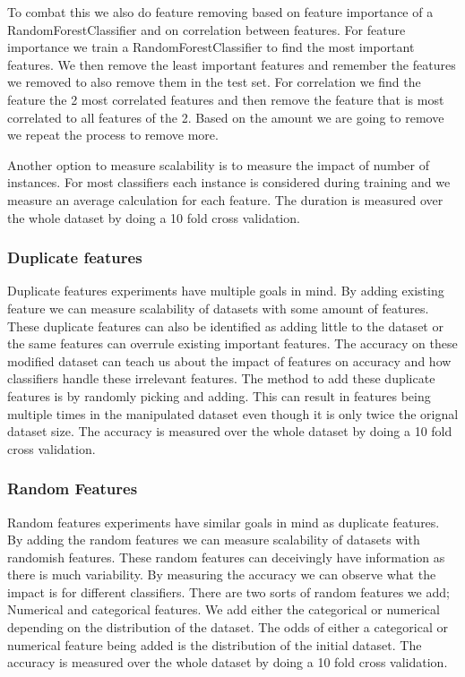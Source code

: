 \documentclass[a4paper,10pt]{article}
\begin{document}
To combat this we also do feature removing based on feature importance of a RandomForestClassifier and on correlation between features. For feature importance we train a RandomForestClassifier to find the most important features. We then remove the least important features and remember the features we removed to also remove them in the test set. For correlation we find the feature the 2 most correlated features and then remove the feature that is most correlated to all features of the 2. Based on the amount we are going to remove we repeat the process to remove more.


Another option  to measure scalability is to measure the impact of number of instances. For most classifiers each instance is considered during training and we measure an average calculation for each feature. The duration is measured over the whole dataset by doing a 10 fold cross validation.

\subsubsection{Duplicate features}
Duplicate features experiments have multiple goals in mind. By adding existing feature we can measure scalability of datasets with some amount of features. These duplicate features can also be identified as adding little to the dataset or the same features can overrule existing important features. The accuracy on these modified dataset
can teach us about the impact of features on accuracy and how classifiers handle these irrelevant features. The method to add these duplicate features is by randomly picking and adding. This can result in features being multiple times in the manipulated  dataset even though it is only twice the orignal dataset size. The accuracy is measured over the whole dataset by doing a 10 fold cross validation.

\subsubsection{Random Features}
Random features experiments have similar goals in mind as duplicate features. By adding the random features we can measure scalability of datasets with randomish features. These random features can deceivingly have information as there is much variability. By measuring the accuracy we can observe what the impact is for different classifiers. There are two sorts of random features we add; Numerical and categorical features. We add either the categorical or numerical depending on the distribution of the dataset. The odds of either a categorical or numerical feature being added is the distribution of the initial dataset. The accuracy is measured over the whole dataset by doing a 10 fold cross validation. %
\end{document}
